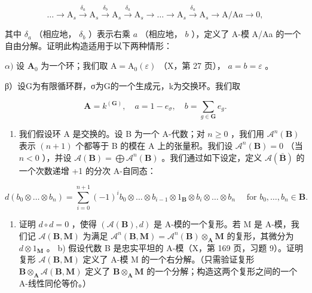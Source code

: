 \[
\dots \longrightarrow \mathrm{A} _ {s} \xrightarrow {\delta_ {a}} \mathrm{A} _ {s} \xrightarrow {\delta_ {b}} \mathrm{A} _ {s} \xrightarrow {\delta_ {a}} \mathrm{A} _ {s} \longrightarrow \dots \longrightarrow \mathrm{A} _ {s} \xrightarrow {\delta_ {a}} \mathrm{A} _ {s} \longrightarrow \mathrm{A} / \mathrm{A} a \longrightarrow 0,
\]

其中 \(\delta_{a}\) （相应地， \(\delta_{b}\) ）表示右乘 \(a\) （相应地， \(b\) ），定义了 A-模 A/Aa 的一个自由分解。证明此构造适用于以下两种情形：

\(\alpha)\) 设 \(\mathbf{A}_0\) 为一个环；我们取 \(\mathrm{A} = \mathrm{A}_0(\varepsilon)\) （X，第 27 页）， \(a = b = \varepsilon\) 。

β）设G为有限循环群，σ为G的一个生成元，k为交换环。我们取

\[
\mathbf {A} = k ^ {(\mathbf {G})}, \quad a = 1 - e _ {\sigma}, \quad b = \sum_ {g \in \mathbf {G}} e _ {g}.
\]

\begin{enumerate}
\def\labelenumi{\arabic{enumi})}
\setcounter{enumi}{1}
\tightlist
\item
  我们假设环 A 是交换的。设 B 为一个 A-代数；对 \(n \geqslant 0\) ，我们用 \(\mathcal{A}^{n}(\mathbf{B})\) 表示 \((n + 1)\) 个都等于 B 的模在 A 上的张量积。我们设 \(\mathcal{A}^{n}(\mathbf{B}) = 0\) （当 \(n < 0\) ），并设 \(\mathcal{A}(\mathbf{B}) = \bigoplus \mathcal{A}^{n}(\mathbf{B})\) 。我们通过如下设定，定义 \(\mathcal{A}(\bar{\mathbf{B}})\) 的一个次数递增 +1 的分次 A-自同态：
\end{enumerate}

\[
d (b _ {0} \otimes \dots \otimes b _ {n}) = \sum_ {i = 0} ^ {n + 1} (- 1) ^ {i} b _ {0} \otimes \dots \otimes b _ {i - 1} \otimes 1 _ {\mathbf {B}} \otimes b _ {i} \otimes \dots \otimes b _ {n} \quad \text { for } b _ {0}, \dots , b _ {n} \in \mathbf {B}.
\]

\begin{enumerate}
\def\labelenumi{\alph{enumi})}
\tightlist
\item
  证明 \(d \circ d = 0\) ，使得 \((\mathcal{A}(\mathbf{B}), d)\) 是 A-模的一个复形。若 M 是 A-模，我们记 \(\mathcal{A}(\mathbf{B}, \mathbf{M})\) 为满足 \(\mathcal{A}^{n}(\mathbf{B}, \mathbf{M}) = \mathcal{A}^{n}(\mathbf{B}) \otimes_{\mathbf{A}} \mathbf{M}\) 的复形，其微分为 \(d \otimes 1_{\mathbf{M}}\) 。 b) 假设代数 B 是忠实平坦的 A-模（X，第 169 页，习题 9）。证明复形 \(\mathcal{A}(\mathbf{B}, \mathbf{M})\) 定义了 A-模 M 的一个右分解。（只需验证复形 \(\mathbf{B} \otimes_{\mathbf{A}} \mathcal{A}(\mathbf{B}, \mathbf{M})\) 定义了 \(\mathbf{B} \otimes_{\mathbf{A}} \mathbf{M}\) 的一个分解；构造这两个复形之间的一个 A-线性同伦等价。）
\end{enumerate}

